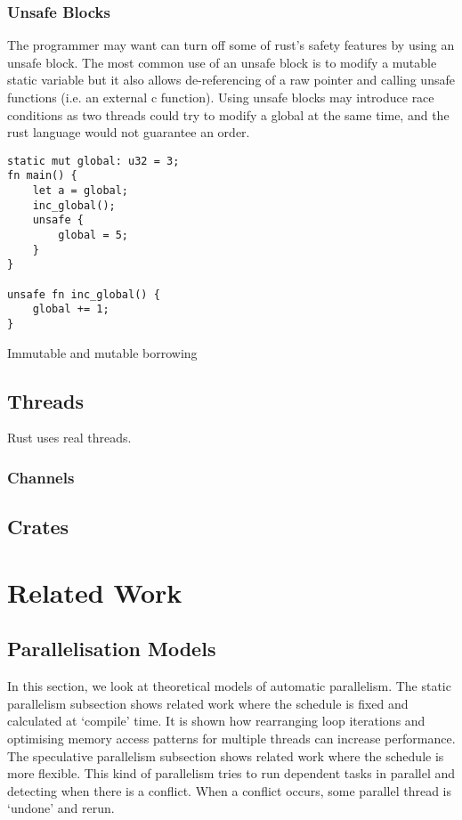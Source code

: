 \subsubsection{Unsafe Blocks}
The programmer may want can turn off some of rust's safety features by using an unsafe block. The most common use of an unsafe block is to modify a mutable static variable but it also allows de-referencing of a raw pointer and calling unsafe functions (i.e. an external c function). Using unsafe blocks may introduce race conditions as two threads could try to modify a global at the same time, and the rust language would not guarantee an order.

\begin{code}
\begin{verbatim}
static mut global: u32 = 3;
fn main() {
    let a = global;
    inc_global();
    unsafe {
        global = 5;
    }
}

unsafe fn inc_global() {
    global += 1;
}
\end{verbatim}
\caption{Immutable and mutable borrowing}
\end{code}

\subsection{Threads}
Rust uses real threads.
\subsubsection{Channels}

\subsection{Crates}

\section{Related Work}
\label{sec:related-work}

\subsection{Parallelisation Models}
\label{sec:related-models}
In this section, we look at theoretical models of automatic parallelism. The static parallelism subsection shows related work where the schedule is fixed and calculated at `compile' time. It is shown how rearranging loop iterations and optimising memory access patterns for multiple threads can increase performance. The speculative parallelism subsection shows related work where the schedule is more flexible. This kind of parallelism tries to run dependent tasks in parallel and detecting when there is a conflict. When a conflict occurs, some parallel thread is `undone' and rerun.

